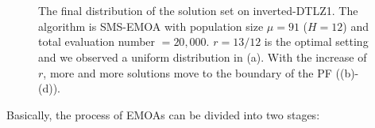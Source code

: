 \documentclass[conference]{IEEEtran}
\begin{document}
\begin{figure}[!t]
  \centering
  \quad
  \\
  \quad
  \\
  \caption{The final distribution of the solution set on inverted-DTLZ1.
  The algorithm is SMS-EMOA with population size $\mu=91$ ($H=12$) and total evaluation number $=20,000$.
  $r=13/12$ is the optimal setting and we observed a uniform distribution in (a).
  With the increase of $r$, more and more solutions move to the boundary of the PF
  ((b)-(d)). 
  }
  \label{dm1}
\end{figure}

%
% 
Basically, the process of EMOAs can be divided into
two stages:
\end{document}
